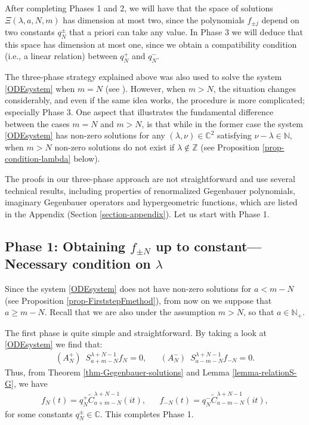 \documentclass[12pt, pdflatex, a4paper]{article}
\theoremstyle{plain}
\theoremstyle{definition}
\def\C{{\mathbb C}}
\def\Geg{\widetilde{C}}
\def\N{{\mathbb N}}
\def\Z{{\mathbb Z}}
\begin{document}
After completing Phases 1 and 2, we will have that the space of solutions $\Xi(\lambda, a, N, m)$ has dimension at most two, since the polynomials $f_{\pm j}$ depend on two constants $q_N^\pm$ that a priori can take any value. In Phase 3 we will deduce that this space has dimension at most one, since we obtain a compatibility condition (i.e., a linear relation) between $q_N^+$ and $q_N^-$. 

The three-phase strategy explained above was also used to solve the system \eqref{ODEsystem} when $m = N$ (see \cite{Per-Val24}). However, when $m > N$, the situation changes considerably, and even if the same idea works, the procedure is more complicated; especially Phase 3. One aspect that illustrates the fundamental difference between the cases $m = N$ and $m >N$, is that while in the former case the system \eqref{ODEsystem} has non-zero solutions for any $(\lambda, \nu) \in \C^2$ satisfying $\nu-\lambda \in \N$, when $m > N$ non-zero solutions do not exist if $\lambda \notin \Z$ (see Proposition \ref{prop-condition-lambda} below).\medskip

The proofs in our three-phase approach are not straightforward and use several technical results, including properties of renormalized Gegenbauer polynomials, imaginary Gegenbauer operators and hypergeometric functions, which are listed in the Appendix (Section \ref{section-appendix}). Let us start with Phase 1.

\subsection{Phase 1: Obtaining $f_{\pm N}$ up to constant---Necessary condition on $\lambda$}\label{section-phase1}

Since the system \eqref{ODEsystem} does not have non-zero solutions for $a < m-N$ (see Proposition \ref{prop-FirststepFmethod}), from now on we suppose that $a \geq m-N$.
Recall that we are also under the assumption $m>N$, so that $a \in \N_+$.


The first phase is quite simple and straightforward. By taking a look at \eqref{ODEsystem} we find that:
\begin{align*}
(A_N^+) \enspace S_{a+m-N}^{\lambda + N - 1} f_N = 0, && (A_N^-) \enspace  S_{a-m-N}^{\lambda + N - 1} f_{-N} = 0.
\end{align*}
Thus, from Theorem \ref{thm-Gegenbauer-solutions} and Lemma \ref{lemma-relationS-G}, we have
\begin{align}\label{expression_fN-and-f-N}
f_N(t) = q_N^+\Geg_{a+m-N}^{\lambda+N-1}(it), && f_{-N}(t) = q_N^-\Geg_{a-m-N}^{\lambda+N-1}(it),
\end{align}
for some constants $q_N^\pm \in \C$. This completes Phase 1.
\end{document}
